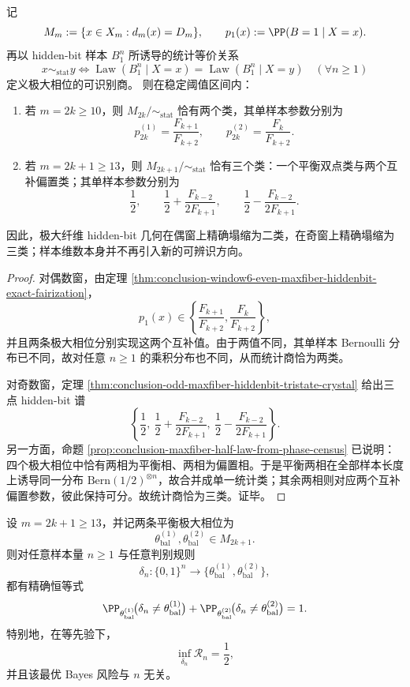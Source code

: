 \begin{theorem}\label{thm:conclusion-maxfiber-hiddenbit-quotient-even2-odd3}
记
\[
M_m:=\{x\in X_m:d_m(x)=D_m\},
\qquad
p_1(x):=\PP(B=1\mid X=x).
\]
再以 hidden-bit 样本 \(B_1^n\) 所诱导的统计等价关系
\[
x\sim_{\mathrm{stat}} y
\iff
\operatorname{Law}(B_1^n\mid X=x)=\operatorname{Law}(B_1^n\mid X=y)
\quad(\forall n\ge 1)
\]
定义极大相位的可识别商。
则在稳定阈值区间内：
\begin{enumerate}
\normalfont
  \item 若 \(m=2k\ge 10\)，则 \(M_{2k}/\!\sim_{\mathrm{stat}}\) 恰有两个类，其单样本参数分别为
  \[
  p_{2k}^{(1)}=\frac{F_{k+1}}{F_{k+2}},
  \qquad
  p_{2k}^{(2)}=\frac{F_{k}}{F_{k+2}}.
  \]
  \item 若 \(m=2k+1\ge 13\)，则 \(M_{2k+1}/\!\sim_{\mathrm{stat}}\) 恰有三个类：一个平衡双点类与两个互补偏置类；其单样本参数分别为
  \[
  \frac12,
  \qquad
  \frac12+\frac{F_{k-2}}{2F_{k+1}},
  \qquad
  \frac12-\frac{F_{k-2}}{2F_{k+1}}.
  \]
\end{enumerate}
因此，极大纤维 hidden-bit 几何在偶窗上精确塌缩为二类，在奇窗上精确塌缩为三类；样本维数本身并不再引入新的可辨识方向。
\end{theorem}

\begin{proof}
对偶数窗，由定理 \ref{thm:conclusion-window6-even-maxfiber-hiddenbit-exact-fairization}，
\[
p_1(x)\in
\left\{
\frac{F_{k+1}}{F_{k+2}},
\frac{F_{k}}{F_{k+2}}
\right\},
\]
并且两条极大相位分别实现这两个互补值。由于两值不同，其单样本 Bernoulli 分布已不同，故对任意 \(n\ge 1\) 的乘积分布也不同，从而统计商恰为两类。

对奇数窗，定理 \ref{thm:conclusion-odd-maxfiber-hiddenbit-tristate-crystal} 给出三点 hidden-bit 谱
\[
\left\{
\frac12,\ \frac12+\frac{F_{k-2}}{2F_{k+1}},\ \frac12-\frac{F_{k-2}}{2F_{k+1}}
\right\}.
\]
另一方面，命题 \ref{prop:conclusion-maxfiber-half-law-from-phase-census} 已说明：四个极大相位中恰有两相为平衡相、两相为偏置相。于是平衡两相在全部样本长度上诱导同一分布
\(\mathrm{Bern}(1/2)^{\otimes n}\)，故合并成单一统计类；其余两相则对应两个互补偏置参数，彼此保持可分。故统计商恰为三类。证毕。
\end{proof}

\begin{corollary}\label{cor:conclusion-maxfiber-hiddenbit-balanced-bayes-wall}
设 \(m=2k+1\ge 13\)，并记两条平衡极大相位为
\[
\theta_{\mathrm{bal}}^{(1)},\theta_{\mathrm{bal}}^{(2)}\in M_{2k+1}.
\]
则对任意样本量 \(n\ge 1\) 与任意判别规则
\[
\delta_n:\{0,1\}^n\to
\{\theta_{\mathrm{bal}}^{(1)},\theta_{\mathrm{bal}}^{(2)}\},
\]
都有精确恒等式
\[
\PP_{\theta_{\mathrm{bal}}^{(1)}}\!\bigl(\delta_n\neq \theta_{\mathrm{bal}}^{(1)}\bigr)
+
\PP_{\theta_{\mathrm{bal}}^{(2)}}\!\bigl(\delta_n\neq \theta_{\mathrm{bal}}^{(2)}\bigr)
=1.
\]
特别地，在等先验下，
\[
\inf_{\delta_n}\mathcal R_n=\frac12,
\]
并且该最优 Bayes 风险与 \(n\) 无关。
\end{corollary}

